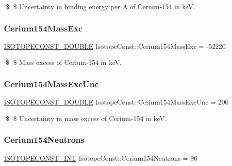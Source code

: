 \$ \$ Uncertainty in binding energy per A of Cerium-\/154 in keV. \mbox{\label{group___isotope_const-_cerium-_ce154_ga4a34824d6b600831d2f940e7ec7045b8}} 
\subsubsection{\texorpdfstring{Cerium154\+Mass\+Exc}{Cerium154MassExc}}
{\footnotesize\ttfamily \mbox{\hyperlink{group___isotope_const-_macros_ga8f45a7272ce02c0b4c65c44636ed719a}{I\+S\+O\+T\+O\+P\+E\+C\+O\+N\+S\+T\+\_\+\+D\+O\+U\+B\+LE}} Isotope\+Const\+::\+Cerium154\+Mass\+Exc = -\/52220}

\$ \$ Mass excess of Cerium-\/154 in keV. \mbox{\label{group___isotope_const-_cerium-_ce154_ga9332d2cf6d010af698c83a32675fcd4f}} 
\subsubsection{\texorpdfstring{Cerium154\+Mass\+Exc\+Unc}{Cerium154MassExcUnc}}
{\footnotesize\ttfamily \mbox{\hyperlink{group___isotope_const-_macros_ga8f45a7272ce02c0b4c65c44636ed719a}{I\+S\+O\+T\+O\+P\+E\+C\+O\+N\+S\+T\+\_\+\+D\+O\+U\+B\+LE}} Isotope\+Const\+::\+Cerium154\+Mass\+Exc\+Unc = 200}

\$ \$ Uncertainty in mass excess of Cerium-\/154 in keV. \mbox{\label{group___isotope_const-_cerium-_ce154_gad3710e5ec60c110d7b15beafa978ebbd}} 
\subsubsection{\texorpdfstring{Cerium154\+Neutrons}{Cerium154Neutrons}}
{\footnotesize\ttfamily \mbox{\hyperlink{group___isotope_const-_macros_ga5f18360b3e99483a35c32d789e62621c}{I\+S\+O\+T\+O\+P\+E\+C\+O\+N\+S\+T\+\_\+\+I\+NT}} Isotope\+Const\+::\+Cerium154\+Neutrons = 96}

